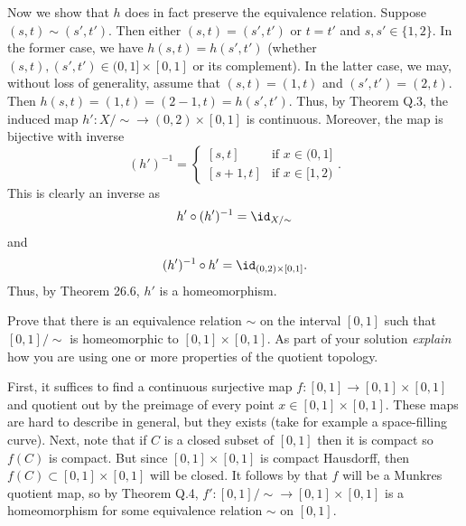 \begin{solution}
  Now we show that \(h\) does in fact preserve the equivalence
  relation. Suppose \((s,t)\sim(s',t')\). Then either \((s,t)=(s',t')\) or
  \(t=t'\) and \(s,s'\in\{1,2\}\). In the former case, we have
  \(h(s,t)=h(s',t')\) (whether \((s,t),(s',t')\in(0,1]\times[0,1]\) or its
  complement). In the latter case, we may, without loss of generality,
  assume that \((s,t)=(1,t)\) and \((s',t')=(2,t)\). Then
  \(h(s,t)=(1,t)=(2-1,t)=h(s',t')\). Thus, by Theorem Q.3, the induced map
  \(h'\colon X/{\sim}\to(0,2)\times[0,1]\) is continuous. Moreover, the map
  is bijective with inverse
  \[
    (h')^{-1}=
    \begin{cases}
      [s,t]&\text{if \(x\in (0,1]\)}\\
      [s+1,t]&\text{if \(x\in [1,2)\)}
    \end{cases}.
  \]
  This is clearly an inverse as
  \[
    h'\circ (h')^{-1}=\id_{X/{\sim}}
  \]
  and
  \[
    (h')^{-1}\circ h'=\id_{(0,2)\times[0,1]}.
  \]
  Thus, by Theorem 26.6, \(h'\) is a homeomorphism.
\end{solution}

\begin{problem}
  Prove that there is an equivalence relation \(\sim\) on the interval
  \([0,1]\) such that \([0,1]/{\sim}\) is homeomorphic to
  \([0,1]\times[0,1]\). As part of your solution \emph{explain} how you are
  using one or more properties of the quotient topology.
\end{problem}
\begin{solution}
  First, it suffices to find a continuous surjective map
  \(f\colon[0,1]\to [0,1]\times[0,1]\) and quotient out by the preimage of
  every point \(x\in[0,1]\times[0,1]\). These maps are hard to describe in
  general, but they exists (take for example a space-filling curve). Next,
  note that if \(C\) is a closed subset of \([0,1]\) then it is compact so
  \(f(C)\) is compact. But since \([0,1]\times[0,1]\) is compact Hausdorff,
  then \(f(C)\subset[0,1]\times[0,1]\) will be closed. It follows by that
  \(f\) will be a Munkres quotient map, so by Theorem Q.4,
  \(f'\colon [0,1]/{\sim}\to[0,1]\times[0,1]\) is a homeomorphism for some
  equivalence relation \(\sim\) on \([0,1]\).
\end{solution}

